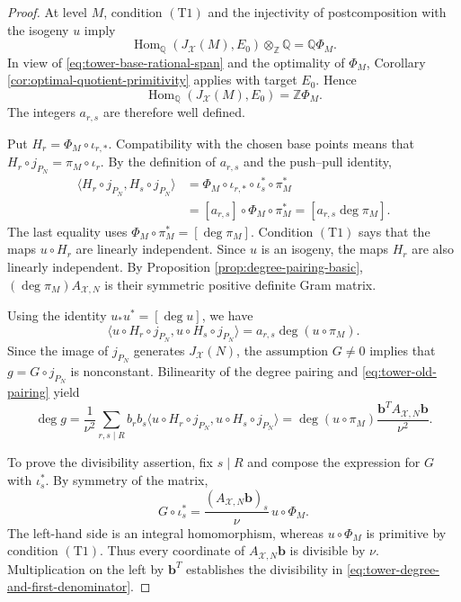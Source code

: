 \documentclass[12pt, letterpaper]{amsart}
\theoremstyle{definition}
\theoremstyle{remark}
\newcommand{\Q}{\mathbb Q}
\newcommand{\Z}{\mathbb Z}
\newcommand{\Hom}{\operatorname{Hom}}
\numberwithin{equation}{section}
\begin{document}
\begin{proof}
At level \(M\), condition \hyperlink{tower-condition-T1}{\(\mathrm{(T1)}\)} and the injectivity of
postcomposition with the isogeny \(u\) imply
\begin{equation}\label{eq:tower-base-rational-span}
        \Hom_\Q(J_{\mathcal X}(M),E_0)\otimes_\Z\Q=\Q\Phi_M.
\end{equation}
In view of \eqref{eq:tower-base-rational-span} and the optimality of
\(\Phi_M\), Corollary \ref{cor:optimal-quotient-primitivity} applies with
target \(E_0\). Hence
\[
        \Hom_\Q(J_{\mathcal X}(M),E_0)=\Z\Phi_M.
\]
The integers \(a_{r,s}\) are therefore well defined.

Put \(H_r=\Phi_M\circ\iota_{r,*}\). Compatibility with the
chosen base points means that
\(H_r\circ j_{P_N}=\pi_M\circ\iota_r\). By the definition
of \(a_{r,s}\) and the push--pull identity,
\begin{align*}
 \langle H_r\circ j_{P_N},H_s\circ j_{P_N}\rangle
 &=\Phi_M\circ\iota_{r,*}\circ\iota_s^*\circ\pi_M^*\\
 &=[a_{r,s}]\circ\Phi_M\circ\pi_M^*
  =[a_{r,s}\deg\pi_M].
\end{align*}
The last equality uses \(\Phi_M\circ\pi_M^*=[\deg\pi_M]\).
Condition \hyperlink{tower-condition-T1}{\(\mathrm{(T1)}\)} says that the maps \(u\circ H_r\) are linearly
independent. Since \(u\) is an isogeny, the maps \(H_r\) are also linearly
independent. By Proposition \ref{prop:degree-pairing-basic},
\((\deg\pi_M)A_{\mathcal X,N}\) is their symmetric positive definite Gram
matrix.

Using the identity \(u_*u^*=[\deg u]\), we have
\begin{equation}\label{eq:tower-old-pairing}
 \langle u\circ H_r\circ j_{P_N},u\circ H_s\circ j_{P_N}\rangle
 =a_{r,s}\deg(u\circ\pi_M).
\end{equation}
Since the image of \(j_{P_N}\) generates \(J_{\mathcal X}(N)\), the assumption
\(G\ne0\) implies that \(g=G\circ j_{P_N}\) is nonconstant. Bilinearity of the
degree pairing and \eqref{eq:tower-old-pairing} yield
\[
 \deg g
 =\frac1{\nu^2}\sum_{r,s\mid R}b_rb_s
   \langle u\circ H_r\circ j_{P_N},u\circ H_s\circ j_{P_N}\rangle
 =\deg(u\circ\pi_M)
  \frac{\boldsymbol b^{T}A_{\mathcal X,N}\boldsymbol b}{\nu^2}.
\]

To prove the divisibility assertion, fix \(s\mid R\) and compose the expression
for \(G\) with \(\iota_s^*\). By symmetry of the matrix,
\[
        G\circ\iota_s^*
        =
        \frac{(A_{\mathcal X,N}\boldsymbol b)_s}{\nu}\,
        u\circ\Phi_M.
\]
The left-hand side is an integral homomorphism, whereas \(u\circ\Phi_M\) is
primitive by condition \hyperlink{tower-condition-T1}{\(\mathrm{(T1)}\)}. Thus every coordinate of
\(A_{\mathcal X,N}\boldsymbol b\) is divisible by \(\nu\). Multiplication on
the left by \(\boldsymbol b^{T}\) establishes the divisibility in
\eqref{eq:tower-degree-and-first-denominator}.
\end{proof}
\end{document}
